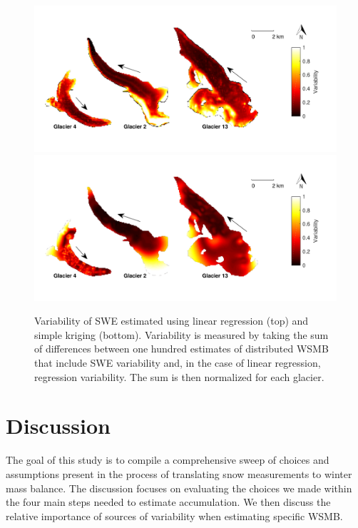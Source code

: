 \documentclass[twocolumn,letterpaper]{igs}
\begin{document}
\begin{figure}
	\centering
	\includegraphics[width =\textwidth]{SpatialVar_LR.pdf}\\
	\includegraphics[width =\textwidth]{SpatialVar_SK.pdf}\\
	\caption{Variability of SWE estimated using linear regression (top) and simple kriging (bottom).	Variability is measured by taking the sum of differences between one hundred estimates of distributed WSMB that include SWE variability and, in the case of linear regression, regression variability. The sum is then normalized for each glacier.}
	\label{fig:WSMBspatialvar}
\end{figure}




\section{Discussion}

The goal of this study is to compile a comprehensive sweep of choices and assumptions present in the process of translating snow measurements to winter mass balance. The discussion focuses on evaluating the choices we made within the four main steps needed to estimate accumulation. We then discuss the relative importance of sources of variability when estimating specific WSMB.
\end{document}
